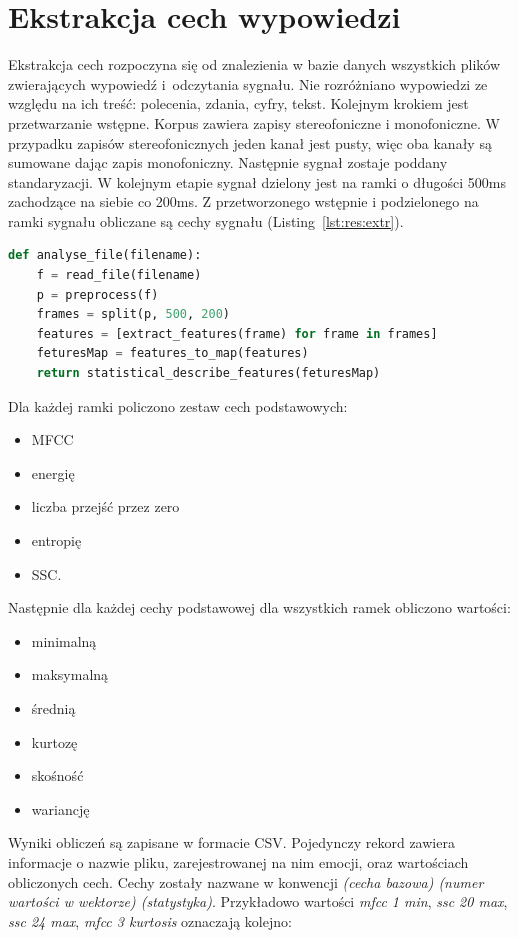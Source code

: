 \documentclass[a4paper,12pt,twoside,openany]{report}
\newcommand{\Lst}[1]{(Listing~\ref{#1})}
\begin{document}
\section{Ekstrakcja cech wypowiedzi}
Ekstrakcja cech rozpoczyna się od znalezienia w bazie danych wszystkich plików zwierających wypowiedź i~odczytania sygnału. 
Nie rozróżniano wypowiedzi ze względu na ich treść: polecenia, zdania, cyfry, tekst.
Kolejnym krokiem jest przetwarzanie wstępne. 
Korpus zawiera zapisy stereofoniczne i monofoniczne. 
W przypadku zapisów stereofonicznych jeden kanał jest pusty, więc oba kanały są sumowane dając zapis monofoniczny.
Następnie sygnał zostaje poddany standaryzacji.
W kolejnym etapie sygnał dzielony jest na ramki o długości 500ms zachodzące na siebie co 200ms.
Z przetworzonego wstępnie i podzielonego na ramki sygnału obliczane są cechy sygnału \Lst{lst:res:extr}.
\begin{lstlisting}[language=Python,label={lst:res:extr},caption={funkcja obliczająca cechy sygnału pojedynczego pliku}]
def analyse_file(filename):
    f = read_file(filename)
    p = preprocess(f)
    frames = split(p, 500, 200)
    features = [extract_features(frame) for frame in frames]
    feturesMap = features_to_map(features)
    return statistical_describe_features(feturesMap)
\end{lstlisting}
Dla każdej ramki policzono zestaw cech podstawowych: 
\begin{itemize}
	\item MFCC
	\item energię
	\item liczba przejść przez zero
	\item entropię
	\item SSC.
\end{itemize}
Następnie dla każdej cechy podstawowej dla wszystkich ramek obliczono wartości:
\begin{itemize}
	\item minimalną
	\item maksymalną
	\item średnią
	\item kurtozę
	\item skośność
	\item wariancję
\end{itemize}
Wyniki obliczeń są zapisane w formacie CSV.
Pojedynczy rekord zawiera informacje o nazwie pliku, zarejestrowanej na nim emocji, 
oraz wartościach obliczonych cech.
Cechy zostały nazwane w konwencji \textit{(cecha bazowa) (numer wartości w wektorze) (statystyka)}.
Przykładowo wartości \textit{mfcc 1 min}, \textit{ssc 20 max}, \textit{ssc 24 max}, \textit{mfcc 3 kurtosis} oznaczają kolejno:
\end{document}
